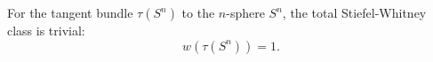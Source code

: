 For the tangent bundle $\tau(S^n)$ to the $n$-sphere $S^n$, the total Stiefel-Whitney class is trivial:
$$w(\tau(S^n)) = 1.$$
